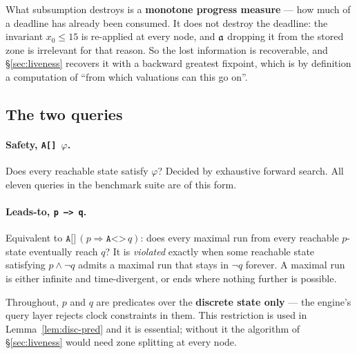 \begin{remark}
\label{rem:progress}
What subsumption destroys is a \textbf{monotone progress measure} --- how much of a deadline has
already been consumed. It does not destroy the deadline: the invariant $x_0 \le 15$ is re-applied
at every node, and $\mathfrak{a}$ dropping it from the stored zone is irrelevant for that reason. So the
lost information is recoverable, and \S\ref{sec:liveness} recovers it with a backward greatest
fixpoint, which is by definition a computation of ``from which valuations can this go on''.
\end{remark}

\subsection{The two queries}

\paragraph{Safety, \texttt{A[] $\varphi$}.} Does every reachable state satisfy $\varphi$?
Decided by exhaustive forward search. All eleven queries in the benchmark suite are of this form.

\paragraph{Leads-to, \texttt{p --> q}.} Equivalent to
$\texttt{A[]}\,(p \Rightarrow \texttt{A<>}\, q)$: does every maximal run from every reachable
$p$-state eventually reach $q$? It is \emph{violated} exactly when some reachable state satisfying
$p \wedge \lnot q$ admits a maximal run that stays in $\lnot q$ forever. A maximal run is either
infinite and time-divergent, or ends where nothing further is possible.

Throughout, $p$ and $q$ are predicates over the \textbf{discrete state only} --- the engine's query
layer rejects clock constraints in them. This restriction is used in
Lemma~\ref{lem:disc-pred} and it is essential; without it the algorithm of \S\ref{sec:liveness}
would need zone splitting at every node.
